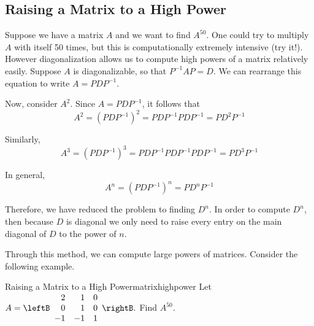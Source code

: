 \subsection{Raising a Matrix to a High Power}

Suppose we have a matrix $A$ and we want to find $A^{50}$. One could
try to multiply $A$ with itself 50 times, but this is computationally
extremely intensive (try it!). However diagonalization allows us to
compute high powers of a matrix relatively easily.  Suppose $A$ is
diagonalizable, so that $P^{-1}AP=D$. We can rearrange this equation
to write $A=PDP^{-1}$.

Now, consider $A^{2}$. Since $A=PDP^{-1}$, it follows that 
\begin{equation*}
A^{2} = \left( PDP^{-1}\right) ^{2}=PDP^{-1}PDP^{-1}=PD^{2}P^{-1}
\end{equation*}

Similarly, 
\begin{equation*}
A^3 = \left( PDP^{-1}\right) ^{3}=PDP^{-1}PDP^{-1}PDP^{-1}=PD^{3}P^{-1}
\end{equation*}

In general,
\begin{equation*}
A^n = \left( PDP^{-1}\right) ^{n}=PD^{n}P^{-1}
\end{equation*}

Therefore, we have reduced the problem to finding $D^{n}$. In order to
compute $D^{n}$, then because $D$ is diagonal we only need to raise
every entry on the main diagonal of $D$ to the power of $n$.

Through this method, we can compute large powers of matrices. Consider the following example.

\begin{example}{Raising a Matrix to a High Power}{matrixhighpower}
Let
  $A=\leftB 
\begin{array}{rrr}
2 & 1 & 0 \\
0 & 1 & 0 \\
-1 & -1 & 1
\end{array}
\rightB. $ Find $A^{50}.$
\end{example}

